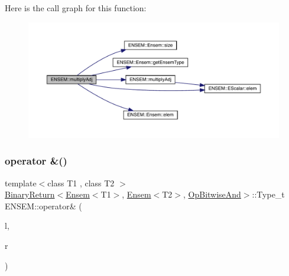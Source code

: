Here is the call graph for this function\+:\nopagebreak
\begin{figure}[H]
\begin{center}
\leavevmode
\includegraphics[width=350pt]{d1/d9e/group__eensem_ga54febfeb3d62a5f905b336fb99d89805_cgraph}
\end{center}
\end{figure}
\mbox{\label{group__eensem_gaeb51787a8e99aa2d96b292b6b53160fb}} 
\subsubsection{\texorpdfstring{operator \&()}{operator \&()}\hspace{0.1cm}{\footnotesize\ttfamily [1/3]}}
{\footnotesize\ttfamily template$<$class T1 , class T2 $>$ \\
\mbox{\hyperlink{structENSEM_1_1BinaryReturn}{Binary\+Return}}$<$\mbox{\hyperlink{classENSEM_1_1Ensem}{Ensem}}$<$T1$>$, \mbox{\hyperlink{classENSEM_1_1Ensem}{Ensem}}$<$T2$>$, \mbox{\hyperlink{structENSEM_1_1OpBitwiseAnd}{Op\+Bitwise\+And}}$>$\+::Type\+\_\+t E\+N\+S\+E\+M\+::operator\& (\begin{DoxyParamCaption}\item[{const \mbox{\hyperlink{classENSEM_1_1Ensem}{Ensem}}$<$ T1 $>$ \&}]{l,  }\item[{const \mbox{\hyperlink{classENSEM_1_1Ensem}{Ensem}}$<$ T2 $>$ \&}]{r }\end{DoxyParamCaption})\hspace{0.3cm}{\ttfamily [inline]}}

